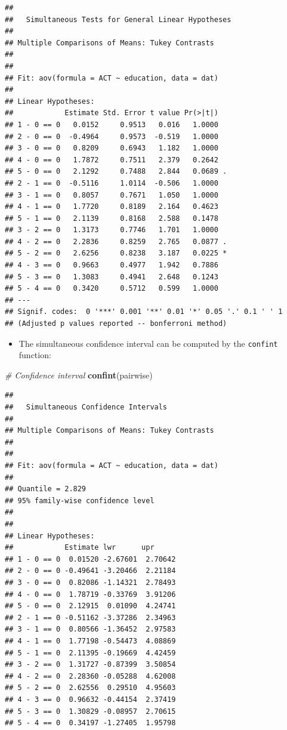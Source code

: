 \documentclass[
]{book}
\newenvironment{Shaded}{\begin{snugshade}}{\end{snugshade}}
\newcommand{\CommentTok}[1]{\textcolor[rgb]{0.56,0.35,0.01}{\textit{#1}}}
\newcommand{\FunctionTok}[1]{\textcolor[rgb]{0.13,0.29,0.53}{\textbf{#1}}}
\newcommand{\NormalTok}[1]{#1}
\providecommand{\tightlist}{%
  \setlength{\itemsep}{0pt}\setlength{\parskip}{0pt}}
\begin{document}
\begin{verbatim}
## 
##   Simultaneous Tests for General Linear Hypotheses
## 
## Multiple Comparisons of Means: Tukey Contrasts
## 
## 
## Fit: aov(formula = ACT ~ education, data = dat)
## 
## Linear Hypotheses:
##            Estimate Std. Error t value Pr(>|t|)  
## 1 - 0 == 0   0.0152     0.9513   0.016   1.0000  
## 2 - 0 == 0  -0.4964     0.9573  -0.519   1.0000  
## 3 - 0 == 0   0.8209     0.6943   1.182   1.0000  
## 4 - 0 == 0   1.7872     0.7511   2.379   0.2642  
## 5 - 0 == 0   2.1292     0.7488   2.844   0.0689 .
## 2 - 1 == 0  -0.5116     1.0114  -0.506   1.0000  
## 3 - 1 == 0   0.8057     0.7671   1.050   1.0000  
## 4 - 1 == 0   1.7720     0.8189   2.164   0.4623  
## 5 - 1 == 0   2.1139     0.8168   2.588   0.1478  
## 3 - 2 == 0   1.3173     0.7746   1.701   1.0000  
## 4 - 2 == 0   2.2836     0.8259   2.765   0.0877 .
## 5 - 2 == 0   2.6256     0.8238   3.187   0.0225 *
## 4 - 3 == 0   0.9663     0.4977   1.942   0.7886  
## 5 - 3 == 0   1.3083     0.4941   2.648   0.1243  
## 5 - 4 == 0   0.3420     0.5712   0.599   1.0000  
## ---
## Signif. codes:  0 '***' 0.001 '**' 0.01 '*' 0.05 '.' 0.1 ' ' 1
## (Adjusted p values reported -- bonferroni method)
\end{verbatim}

\begin{itemize}
\tightlist
\item
  The simultaneous confidence interval can be computed by the \texttt{confint} function:
\end{itemize}

\begin{Shaded}
\begin{Highlighting}[]
\CommentTok{\# Confidence interval}
\FunctionTok{confint}\NormalTok{(pairwise)}
\end{Highlighting}
\end{Shaded}

\begin{verbatim}
## 
##   Simultaneous Confidence Intervals
## 
## Multiple Comparisons of Means: Tukey Contrasts
## 
## 
## Fit: aov(formula = ACT ~ education, data = dat)
## 
## Quantile = 2.829
## 95% family-wise confidence level
##  
## 
## Linear Hypotheses:
##            Estimate lwr      upr     
## 1 - 0 == 0  0.01520 -2.67601  2.70642
## 2 - 0 == 0 -0.49641 -3.20466  2.21184
## 3 - 0 == 0  0.82086 -1.14321  2.78493
## 4 - 0 == 0  1.78719 -0.33769  3.91206
## 5 - 0 == 0  2.12915  0.01090  4.24741
## 2 - 1 == 0 -0.51162 -3.37286  2.34963
## 3 - 1 == 0  0.80566 -1.36452  2.97583
## 4 - 1 == 0  1.77198 -0.54473  4.08869
## 5 - 1 == 0  2.11395 -0.19669  4.42459
## 3 - 2 == 0  1.31727 -0.87399  3.50854
## 4 - 2 == 0  2.28360 -0.05288  4.62008
## 5 - 2 == 0  2.62556  0.29510  4.95603
## 4 - 3 == 0  0.96632 -0.44154  2.37419
## 5 - 3 == 0  1.30829 -0.08957  2.70615
## 5 - 4 == 0  0.34197 -1.27405  1.95798
\end{verbatim}
\end{document}
